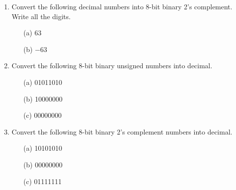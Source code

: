 \documentclass{article}
\begin{document}
\begin{enumerate}
    \item Convert the following decimal numbers into 8-bit binary 2’s complement. Write all the digits.
    \begin{itemize}
        \item[(a)] 63
        \item[(b)] −63
    \end{itemize}

    \item Convert the following 8-bit binary unsigned numbers into decimal.
    \begin{itemize}
        \item[(a)] 01011010
        \item[(b)] 10000000
        \item[(c)] 00000000
    \end{itemize}

    \item Convert the following 8-bit binary 2’s complement numbers into decimal.
    \begin{itemize}
        \item[(a)] 10101010
        \item[(b)] 00000000
        \item[(c)] 01111111
    \end{itemize}

\end{enumerate}
\end{document}
